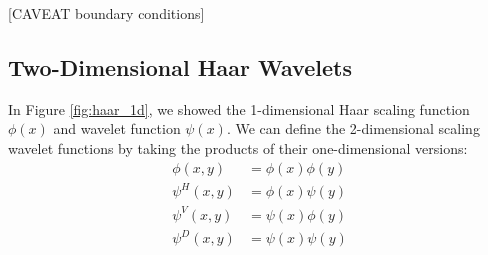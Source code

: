 [CAVEAT boundary conditions]

\subsection{Two-Dimensional Haar Wavelets}
In Figure \ref{fig:haar_1d}, we showed the 1-dimensional Haar scaling function $\phi(x)$ and wavelet function $\psi(x)$.
We can define the 2-dimensional scaling wavelet functions by taking the products of their one-dimensional versions:
\begin{equation}
  \begin{split}
    \phi(x,y) &= \phi(x) \phi(y)\\
    \psi^H(x,y) &= \phi(x) \psi(y) \\
    \psi^V(x,y) &= \psi(x) \phi(y) \\
    \psi^D(x,y) &= \psi(x) \psi(y)
  \end{split}
\end{equation}

